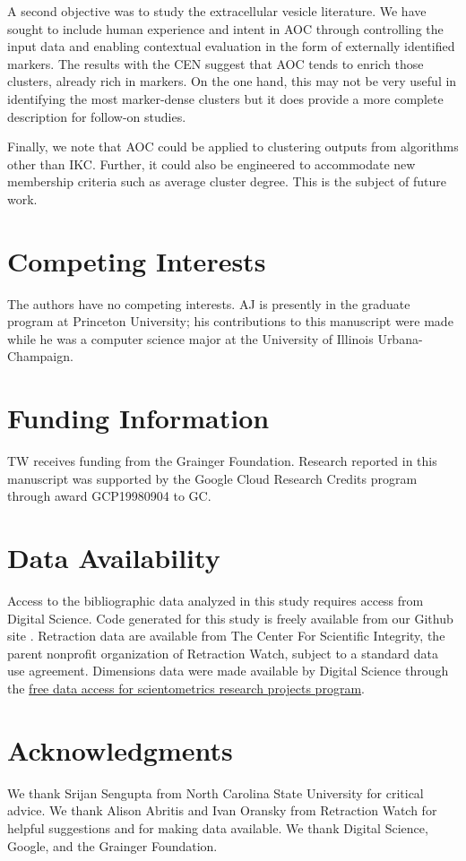 \documentclass[12pt, oneside]{article}   	%
\begin{document}
A second objective was to study the extracellular vesicle literature. We have sought to include human experience and intent \citep{vonluxburg2012clustering} in AOC through controlling the input data and enabling contextual evaluation in the form of externally identified markers. The results with the CEN suggest that AOC tends to enrich those clusters, already rich in markers. On the one hand, this may not be very useful in identifying the most marker-dense clusters but it does provide a more complete description for follow-on studies. 

Finally, we note that AOC could be applied to clustering  outputs from algorithms other than IKC. Further, it could also be engineered to accommodate new membership criteria such as average cluster degree. This is the subject of future work. 
	
\section*{Competing Interests} \vspace{3mm} The authors have no competing interests. AJ is presently in the graduate program at Princeton University; his contributions to this manuscript were made while he was a computer science major at the University of Illinois Urbana-Champaign.
	
\section*{Funding Information} TW receives funding from the Grainger Foundation. Research reported in this manuscript was supported by the Google Cloud Research Credits program through award GCP19980904 to GC.
	
\section*{Data Availability} Access to the bibliographic data analyzed in this study requires access from Digital Science. Code generated for this study is freely available from our Github site \citep{Liu_BL_2021}. Retraction data are available from The Center For Scientific Integrity, the parent nonprofit organization of Retraction Watch, subject to a standard data use agreement. Dimensions data were made available by Digital Science through the \href{http://www.dimensions.ai/scientometric-research/.}{free data access for scientometrics research projects program}.
	
\section*{Acknowledgments} We thank Srijan Sengupta from North Carolina State University for critical advice. We thank Alison Abritis and Ivan Oransky from Retraction Watch for helpful suggestions and for making data available. We thank Digital Science, Google, and the Grainger Foundation. 



\end{document}
